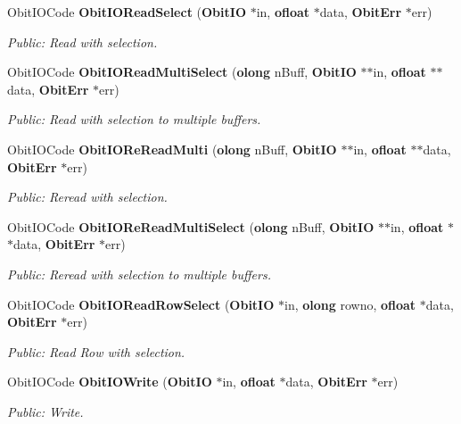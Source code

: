 \begin{CompactItemize}
Obit\-IOCode {\bf Obit\-IORead\-Select} ({\bf Obit\-IO} $\ast$in, {\bf ofloat} $\ast$data, {\bf Obit\-Err} $\ast$err)
\begin{CompactList}\small\item\em Public: Read with selection. \item\end{CompactList}\item 
Obit\-IOCode {\bf Obit\-IORead\-Multi\-Select} ({\bf olong} n\-Buff, {\bf Obit\-IO} $\ast$$\ast$in, {\bf ofloat} $\ast$$\ast$data, {\bf Obit\-Err} $\ast$err)
\begin{CompactList}\small\item\em Public: Read with selection to multiple buffers. \item\end{CompactList}\item 
Obit\-IOCode {\bf Obit\-IORe\-Read\-Multi} ({\bf olong} n\-Buff, {\bf Obit\-IO} $\ast$$\ast$in, {\bf ofloat} $\ast$$\ast$data, {\bf Obit\-Err} $\ast$err)
\begin{CompactList}\small\item\em Public: Reread with selection. \item\end{CompactList}\item 
Obit\-IOCode {\bf Obit\-IORe\-Read\-Multi\-Select} ({\bf olong} n\-Buff, {\bf Obit\-IO} $\ast$$\ast$in, {\bf ofloat} $\ast$$\ast$data, {\bf Obit\-Err} $\ast$err)
\begin{CompactList}\small\item\em Public: Reread with selection to multiple buffers. \item\end{CompactList}\item 
Obit\-IOCode {\bf Obit\-IORead\-Row\-Select} ({\bf Obit\-IO} $\ast$in, {\bf olong} rowno, {\bf ofloat} $\ast$data, {\bf Obit\-Err} $\ast$err)
\begin{CompactList}\small\item\em Public: Read Row with selection. \item\end{CompactList}\item 
Obit\-IOCode {\bf Obit\-IOWrite} ({\bf Obit\-IO} $\ast$in, {\bf ofloat} $\ast$data, {\bf Obit\-Err} $\ast$err)
\begin{CompactList}\small\item\em Public: Write. \item\end{CompactList}\item 

\end{CompactItemize}
